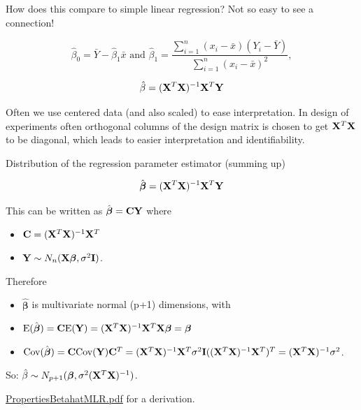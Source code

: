 \documentclass[10pt,ignorenonframetext,]{beamer}
\providecommand{\tightlist}{%
  \setlength{\itemsep}{0pt}\setlength{\parskip}{0pt}}
\begin{document}
\begin{frame}

How does this compare to simple linear regression? Not so easy to see a
connection!

\[\hat{\beta}_0 = \bar{Y}-\hat{\beta}_1 \bar{x} \text{ and } \hat{\beta}_1 = \frac{\sum_{i=1}^n(x_i-\bar{x})(Y_i-\bar{Y})}{\sum_{i=1}^n(x_i-\bar{x})^2},\]

\[ \hat\beta=({\bf X}^T{\bf X})^{-1} {\bf X}^T {\bf Y}\]

Often we use centered data (and also scaled) to ease interpretation. In
design of experiments often orthogonal columns of the design matrix is
chosen to get \({\bf X}^T{\bf X}\) to be diagonal, which leads to easier
interpretation and identifiability.

\end{frame}

\begin{frame}

\begin{block}{Distribution of the regression parameter estimator
(summing up)}

\[ \hat{\boldsymbol\beta}=({\bf X}^T{\bf X})^{-1} {\bf X}^T {\bf Y}\]

This can be written as \(\hat{\boldsymbol\beta}={\bf C}{\bf Y}\) where

\begin{itemize}
\tightlist
\item
  \({\bf C}=({\bf X}^T{\bf X})^{-1} {\bf X}^T\)
\item
  \({\bf Y} \sim N_{n}({\bf X} {\boldsymbol\beta},\sigma^2 {\bf I})\).
\end{itemize}

Therefore

\begin{itemize}
\tightlist
\item
  \(\hat{\boldsymbol\beta}\) is multivariate normal (p+1) dimensions,
  with
\item
  \(\text{E}(\hat{\boldsymbol\beta})={\bf C}\text{E}({\bf Y})=({\bf X}^T{\bf X})^{-1} {\bf X}^T{\bf X} {\boldsymbol\beta}={\boldsymbol\beta}\)
\item
  \(\text{Cov}(\hat{\boldsymbol\beta})={\bf C}\text{Cov}({\bf Y}){\bf C}^T=({\bf X}^T{\bf X})^{-1} {\bf X}^T \sigma^2 {\bf I}(({\bf X}^T{\bf X})^{-1} {\bf X}^T)^T =({\bf X}^T{\bf X})^{-1} \sigma^2\).
\end{itemize}

So:
\(\hat{\beta}\sim N_{p+1}(\boldsymbol{\beta},\sigma^2({\bf X}^T{\bf X})^{-1})\).

\href{https://www.math.ntnu.no/emner/TMA4268/2018v/notes/PropertiesBetahatMLR.pdf}{PropertiesBetahatMLR.pdf}
for a derivation.

\end{block}

\end{frame}
\end{document}
